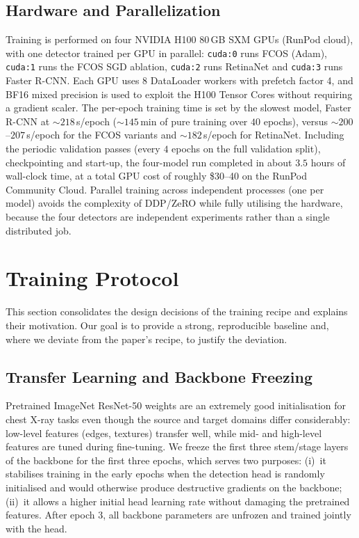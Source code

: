 \documentclass[11pt,a4paper]{article}
\begin{document}
\subsection{Hardware and Parallelization}

Training is performed on four NVIDIA H100 80\,GB SXM GPUs (RunPod cloud), with one detector trained per GPU in parallel: \texttt{cuda:0} runs FCOS (Adam), \texttt{cuda:1} runs the FCOS SGD ablation, \texttt{cuda:2} runs RetinaNet and \texttt{cuda:3} runs Faster R-CNN. Each GPU uses 8 DataLoader workers with prefetch factor 4, and BF16 mixed precision is used to exploit the H100 Tensor Cores without requiring a gradient scaler. The per-epoch training time is set by the slowest model, Faster R-CNN at $\sim 218$\,s/epoch ($\sim 145$\,min of pure training over $40$ epochs), versus $\sim 200$--$207$\,s/epoch for the FCOS variants and $\sim 182$\,s/epoch for RetinaNet. Including the periodic validation passes (every $4$ epochs on the full validation split), checkpointing and start-up, the four-model run completed in about $3.5$ hours of wall-clock time, at a total GPU cost of roughly \$30--40 on the RunPod Community Cloud. Parallel training across independent processes (one per model) avoids the complexity of DDP/ZeRO while fully utilising the hardware, because the four detectors are independent experiments rather than a single distributed job.

\pagebreak

\section{Training Protocol}
\label{sec:training-protocol}

This section consolidates the design decisions of the training recipe and explains their motivation. Our goal is to provide a strong, reproducible baseline and, where we deviate from the paper's recipe, to justify the deviation.

\subsection{Transfer Learning and Backbone Freezing}

Pretrained ImageNet ResNet-50 weights are an extremely good initialisation for chest X-ray tasks even though the source and target domains differ considerably: low-level features (edges, textures) transfer well, while mid- and high-level features are tuned during fine-tuning. We freeze the first three stem/stage layers of the backbone for the first three epochs, which serves two purposes: (i)~it stabilises training in the early epochs when the detection head is randomly initialised and would otherwise produce destructive gradients on the backbone; (ii)~it allows a higher initial head learning rate without damaging the pretrained features. After epoch 3, all backbone parameters are unfrozen and trained jointly with the head.
\end{document}
